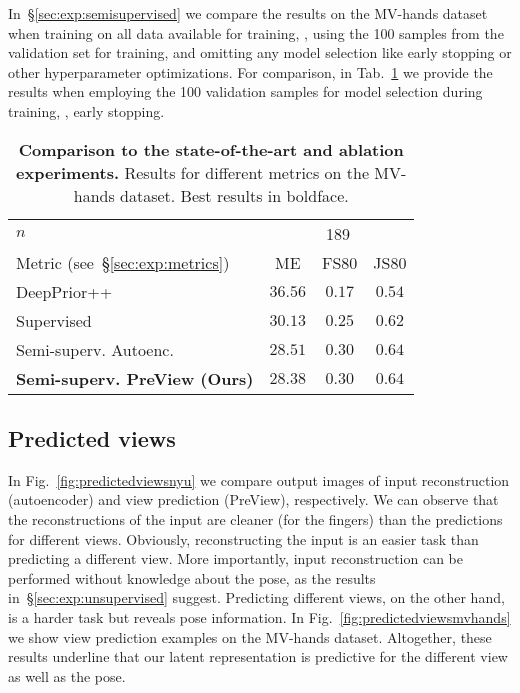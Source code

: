 \documentclass[10pt,twocolumn,letterpaper]{article}
\begin{document}
In~\S\ref{sec:exp:semisupervised} we compare the results on the MV-hands dataset 
when training on all data available 
for training, \ie, using the 100 samples from the validation set for training, 
and omitting any model selection 
like early stopping or other hyperparameter optimizations.
For comparison, in Tab.~\ref{tab:exp:sup:semisupervised:ablation:icg:189} 
we provide the results when employing the 100 validation samples for 
model selection during training, \ie, early stopping.

\begin{table}[t]
\begin{center}
\begin{tabular}{l c c c}
\toprule 
$n$ & \multicolumn{3}{c}{189} \\ 
\cmidrule(rl){2-4}
Metric (see~\S\ref{sec:exp:metrics}) & ME & FS80 & JS80 \\ 
\midrule
DeepPrior++~\cite{Oberweger2017iccvw_deeppriorpp} & $36.56$ & $0.17$ & $0.54$ \\ 
\midrule
Supervised & $30.13$ & $0.25$ & $0.62$ \\ 
Semi-superv. Autoenc. & $28.51$ & $\mathbf{0.30}$ & $\mathbf{0.64}$ \\ 
\textbf{Semi-superv. PreView (Ours)} & $\mathbf{28.38}$ & $\mathbf{0.30}$ & $\mathbf{0.64}$ \\ 
\bottomrule
\end{tabular}
\end{center}
\caption{\textbf{Comparison to the state-of-the-art and ablation experiments.}
  Results for different metrics on the MV-hands dataset.
  Best results in boldface.
  }
\label{tab:exp:sup:semisupervised:ablation:icg:189}
\end{table}\subsection{Predicted views}\label{sup:sec:predictedviews}

In Fig.~\ref{fig:predictedviewsnyu} 
we compare output images of 
input reconstruction (autoencoder) and view prediction (PreView), respectively.
We can observe that the reconstructions of the input are cleaner 
(\eg for the fingers) than the predictions for different views.
Obviously, reconstructing the input is an easier task than predicting a different view.
More importantly, input reconstruction can 
be performed without knowledge about the pose, as the results 
in~\S\ref{sec:exp:unsupervised} suggest. 
Predicting different views, on the other hand, is a harder task but reveals pose information.
In Fig.~\ref{fig:predictedviewsmvhands} we show view prediction examples 
on the MV-hands dataset.
Altogether, these results underline that our latent representation is predictive 
for the different view as well as the pose.
\end{document}
